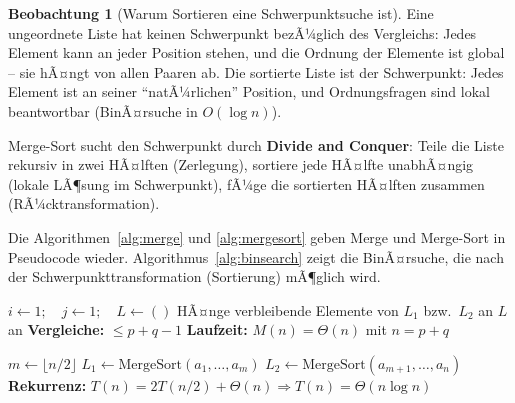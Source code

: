 ﻿\documentclass[a4paper,12pt]{report}
\theoremstyle{definition}
\newtheorem{beobachtung}{Beobachtung}
\begin{document}
\begin{beobachtung}[Warum Sortieren eine Schwerpunktsuche ist]
    Eine ungeordnete Liste hat keinen Schwerpunkt bezÃ¼glich des
    Vergleichs: Jedes Element kann an jeder Position stehen,
    und die Ordnung der Elemente ist global -- sie hÃ¤ngt von
    allen Paaren ab. Die sortierte Liste ist der Schwerpunkt:
    Jedes Element ist an seiner ``natÃ¼rlichen'' Position,
    und Ordnungsfragen sind lokal beantwortbar (BinÃ¤rsuche in $O(\log n)$).

    Merge-Sort sucht den Schwerpunkt durch \textbf{Divide and Conquer}:
    Teile die Liste rekursiv in zwei HÃ¤lften (Zerlegung), sortiere
    jede HÃ¤lfte unabhÃ¤ngig (lokale LÃ¶sung im Schwerpunkt),
    fÃ¼ge die sortierten HÃ¤lften zusammen (RÃ¼cktransformation).
\end{beobachtung}

Die Algorithmen~\ref{alg:merge} und \ref{alg:mergesort} geben Merge und Merge-Sort in Pseudocode wieder. Algorithmus~\ref{alg:binsearch} zeigt die BinÃ¤rsuche, die nach der Schwerpunkttransformation (Sortierung) mÃ¶glich wird.


\begin{algorithm}[H]
\DontPrintSemicolon
\caption{Merge}\label{alg:merge}
$i \leftarrow 1;\quad j \leftarrow 1;\quad L \leftarrow ()$\;
HÃ¤nge verbleibende Elemente von $L_1$ bzw.\ $L_2$ an $L$ an\;
\;
\BlankLine
\textbf{Vergleiche:} $\leq p + q - 1$ \quad \textbf{Laufzeit:} $M(n) = \Theta(n)$ mit $n = p + q$
\end{algorithm}

\begin{algorithm}[H]
\DontPrintSemicolon
\caption{Merge-Sort}\label{alg:mergesort}
$m \leftarrow \lfloor n/2 \rfloor$\;
$L_1 \leftarrow \mathrm{MergeSort}(a_1, \ldots, a_m)$ 
$L_2 \leftarrow \mathrm{MergeSort}(a_{m+1}, \ldots, a_n)$ 
 
\BlankLine
\textbf{Rekurrenz:} $T(n) = 2T(n/2) + \Theta(n)$\quad $\Rightarrow$\quad $T(n) = \Theta(n \log n)$
\end{algorithm}
\end{document}
